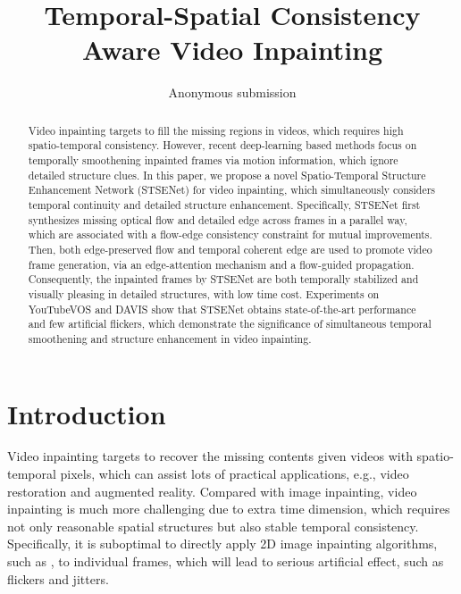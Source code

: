 \documentclass[letterpaper]{article} %
\title{Temporal-Spatial Consistency Aware Video Inpainting }
\author{Anonymous submission}
\begin{document}
\maketitle

\begin{abstract}
	Video inpainting targets to fill the missing regions in videos, which requires high spatio-temporal consistency.
	However, recent deep-learning based methods focus on temporally smoothening inpainted frames via motion information, which ignore detailed structure clues.
	In this paper, we propose a novel Spatio-Temporal Structure Enhancement Network (STSENet) for video inpainting, which simultaneously considers temporal continuity and detailed structure enhancement. 
	Specifically, STSENet first synthesizes missing optical flow and detailed edge across frames in a parallel way, which are associated with a flow-edge consistency constraint for mutual improvements.
	Then, both edge-preserved flow and temporal coherent edge are used to promote video frame generation, via an edge-attention mechanism and a flow-guided propagation.
	Consequently, the inpainted frames by STSENet are both temporally stabilized and visually pleasing in detailed structures, with low time cost. 
	Experiments on YouTubeVOS and DAVIS show that STSENet obtains state-of-the-art performance and few artificial flickers, which demonstrate the significance of simultaneous temporal smoothening and structure enhancement in video inpainting.
	
\end{abstract}




\section{Introduction}
\noindent Video inpainting targets to recover the missing contents given videos with spatio-temporal pixels, which can assist lots of practical applications, e.g., video restoration and augmented reality. Compared with image inpainting, video inpainting is much more challenging due to extra time dimension, which requires not only reasonable spatial structures but also stable temporal consistency. Specifically, it is suboptimal to directly apply 2D image inpainting algorithms, such as \cite{yu2018free,Xiong_2019_CVPR}, to individual frames, which will lead to serious artificial effect, such as flickers and jitters. 
\end{document}
